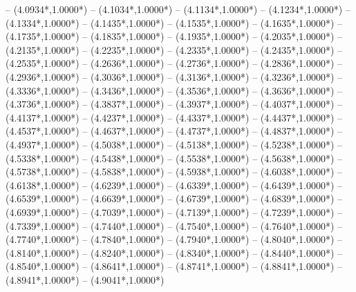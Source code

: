 {	-- ({4.0934*\dx},{1.0000*\dy})
	-- ({4.1034*\dx},{1.0000*\dy})
	-- ({4.1134*\dx},{1.0000*\dy})
	-- ({4.1234*\dx},{1.0000*\dy})
	-- ({4.1334*\dx},{1.0000*\dy})
	-- ({4.1435*\dx},{1.0000*\dy})
	-- ({4.1535*\dx},{1.0000*\dy})
	-- ({4.1635*\dx},{1.0000*\dy})
	-- ({4.1735*\dx},{1.0000*\dy})
	-- ({4.1835*\dx},{1.0000*\dy})
	-- ({4.1935*\dx},{1.0000*\dy})
	-- ({4.2035*\dx},{1.0000*\dy})
	-- ({4.2135*\dx},{1.0000*\dy})
	-- ({4.2235*\dx},{1.0000*\dy})
	-- ({4.2335*\dx},{1.0000*\dy})
	-- ({4.2435*\dx},{1.0000*\dy})
	-- ({4.2535*\dx},{1.0000*\dy})
	-- ({4.2636*\dx},{1.0000*\dy})
	-- ({4.2736*\dx},{1.0000*\dy})
	-- ({4.2836*\dx},{1.0000*\dy})
	-- ({4.2936*\dx},{1.0000*\dy})
	-- ({4.3036*\dx},{1.0000*\dy})
	-- ({4.3136*\dx},{1.0000*\dy})
	-- ({4.3236*\dx},{1.0000*\dy})
	-- ({4.3336*\dx},{1.0000*\dy})
	-- ({4.3436*\dx},{1.0000*\dy})
	-- ({4.3536*\dx},{1.0000*\dy})
	-- ({4.3636*\dx},{1.0000*\dy})
	-- ({4.3736*\dx},{1.0000*\dy})
	-- ({4.3837*\dx},{1.0000*\dy})
	-- ({4.3937*\dx},{1.0000*\dy})
	-- ({4.4037*\dx},{1.0000*\dy})
	-- ({4.4137*\dx},{1.0000*\dy})
	-- ({4.4237*\dx},{1.0000*\dy})
	-- ({4.4337*\dx},{1.0000*\dy})
	-- ({4.4437*\dx},{1.0000*\dy})
	-- ({4.4537*\dx},{1.0000*\dy})
	-- ({4.4637*\dx},{1.0000*\dy})
	-- ({4.4737*\dx},{1.0000*\dy})
	-- ({4.4837*\dx},{1.0000*\dy})
	-- ({4.4937*\dx},{1.0000*\dy})
	-- ({4.5038*\dx},{1.0000*\dy})
	-- ({4.5138*\dx},{1.0000*\dy})
	-- ({4.5238*\dx},{1.0000*\dy})
	-- ({4.5338*\dx},{1.0000*\dy})
	-- ({4.5438*\dx},{1.0000*\dy})
	-- ({4.5538*\dx},{1.0000*\dy})
	-- ({4.5638*\dx},{1.0000*\dy})
	-- ({4.5738*\dx},{1.0000*\dy})
	-- ({4.5838*\dx},{1.0000*\dy})
	-- ({4.5938*\dx},{1.0000*\dy})
	-- ({4.6038*\dx},{1.0000*\dy})
	-- ({4.6138*\dx},{1.0000*\dy})
	-- ({4.6239*\dx},{1.0000*\dy})
	-- ({4.6339*\dx},{1.0000*\dy})
	-- ({4.6439*\dx},{1.0000*\dy})
	-- ({4.6539*\dx},{1.0000*\dy})
	-- ({4.6639*\dx},{1.0000*\dy})
	-- ({4.6739*\dx},{1.0000*\dy})
	-- ({4.6839*\dx},{1.0000*\dy})
	-- ({4.6939*\dx},{1.0000*\dy})
	-- ({4.7039*\dx},{1.0000*\dy})
	-- ({4.7139*\dx},{1.0000*\dy})
	-- ({4.7239*\dx},{1.0000*\dy})
	-- ({4.7339*\dx},{1.0000*\dy})
	-- ({4.7440*\dx},{1.0000*\dy})
	-- ({4.7540*\dx},{1.0000*\dy})
	-- ({4.7640*\dx},{1.0000*\dy})
	-- ({4.7740*\dx},{1.0000*\dy})
	-- ({4.7840*\dx},{1.0000*\dy})
	-- ({4.7940*\dx},{1.0000*\dy})
	-- ({4.8040*\dx},{1.0000*\dy})
	-- ({4.8140*\dx},{1.0000*\dy})
	-- ({4.8240*\dx},{1.0000*\dy})
	-- ({4.8340*\dx},{1.0000*\dy})
	-- ({4.8440*\dx},{1.0000*\dy})
	-- ({4.8540*\dx},{1.0000*\dy})
	-- ({4.8641*\dx},{1.0000*\dy})
	-- ({4.8741*\dx},{1.0000*\dy})
	-- ({4.8841*\dx},{1.0000*\dy})
	-- ({4.8941*\dx},{1.0000*\dy})
	-- ({4.9041*\dx},{1.0000*\dy})
}
